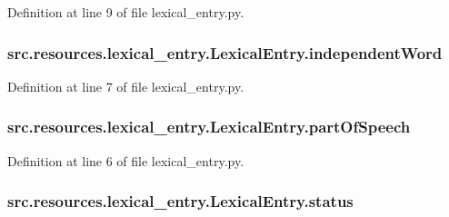 Definition at line 9 of file lexical\+\_\+entry.\+py.

\hypertarget{classsrc_1_1resources_1_1lexical__entry_1_1_lexical_entry_a02159532576e712c6818a84130d0c8dc}{
\subsubsection[{independent\+Word}]{\setlength{\rightskip}{0pt plus 5cm}src.\+resources.\+lexical\+\_\+entry.\+Lexical\+Entry.\+independent\+Word}}\label{classsrc_1_1resources_1_1lexical__entry_1_1_lexical_entry_a02159532576e712c6818a84130d0c8dc}


Definition at line 7 of file lexical\+\_\+entry.\+py.

\hypertarget{classsrc_1_1resources_1_1lexical__entry_1_1_lexical_entry_a46b822c5855f5360e5023f35d66478f0}{
\subsubsection[{part\+Of\+Speech}]{\setlength{\rightskip}{0pt plus 5cm}src.\+resources.\+lexical\+\_\+entry.\+Lexical\+Entry.\+part\+Of\+Speech}}\label{classsrc_1_1resources_1_1lexical__entry_1_1_lexical_entry_a46b822c5855f5360e5023f35d66478f0}


Definition at line 6 of file lexical\+\_\+entry.\+py.

\hypertarget{classsrc_1_1resources_1_1lexical__entry_1_1_lexical_entry_a121e70fe8e1d31e711d7fb62d1de82bd}{
\subsubsection[{status}]{\setlength{\rightskip}{0pt plus 5cm}src.\+resources.\+lexical\+\_\+entry.\+Lexical\+Entry.\+status}}\label{classsrc_1_1resources_1_1lexical__entry_1_1_lexical_entry_a121e70fe8e1d31e711d7fb62d1de82bd}


